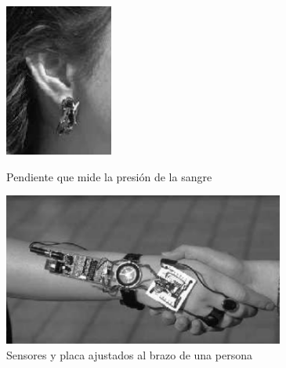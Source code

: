 \begin{figure}[]
   \begin{minipage}{0.48\textwidth}
     \centering
     \includegraphics[width=.7\linewidth, height=5cm]{Imagenes/w1}
     \caption{Pendiente que mide la presión de la sangre}
     \label{fig:w1}
   \end{minipage}\hfill
   \begin {minipage}{0.48\textwidth}
     \centering
     \includegraphics[width=.7\linewidth, height=5cm]{Imagenes/w2}
     \caption{Sensores y placa ajustados al brazo de una persona}
     \label{fig:w2}
   \end{minipage}
\end{figure}

